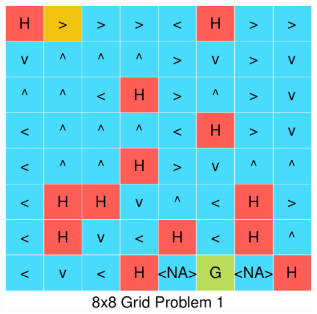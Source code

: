 \documentclass[11pt,]{article}
\begin{document}
\begin{center}\includegraphics[width=1\linewidth]{project_files/figure-latex/lakes3-2} \end{center}
\end{document}
